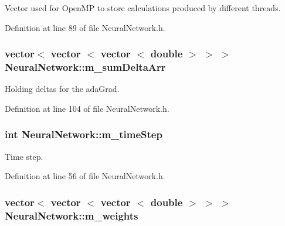 Vector used for Open\+MP to store calculations produced by different threads. 



Definition at line 89 of file Neural\+Network.\+h.

\subsubsection[{\texorpdfstring{m\+\_\+sum\+Delta\+Arr}{m_sumDeltaArr}}]{\setlength{\rightskip}{0pt plus 5cm}vector$<$ vector $<$ vector $<$ double $>$ $>$ $>$ Neural\+Network\+::m\+\_\+sum\+Delta\+Arr\hspace{0.3cm}{\ttfamily [protected]}}\hypertarget{classNeuralNetwork_a0b6c7ff6e00c4f91e684217be91b0a28}{}\label{classNeuralNetwork_a0b6c7ff6e00c4f91e684217be91b0a28}


Holding deltas for the ada\+Grad. 



Definition at line 104 of file Neural\+Network.\+h.

\subsubsection[{\texorpdfstring{m\+\_\+time\+Step}{m_timeStep}}]{\setlength{\rightskip}{0pt plus 5cm}int Neural\+Network\+::m\+\_\+time\+Step\hspace{0.3cm}{\ttfamily [protected]}}\hypertarget{classNeuralNetwork_aea6b9756c3ef7e82b2d40414beb37984}{}\label{classNeuralNetwork_aea6b9756c3ef7e82b2d40414beb37984}


Time step. 



Definition at line 56 of file Neural\+Network.\+h.

\subsubsection[{\texorpdfstring{m\+\_\+weights}{m_weights}}]{\setlength{\rightskip}{0pt plus 5cm}vector$<$ vector $<$ vector $<$ double $>$ $>$ $>$ Neural\+Network\+::m\+\_\+weights\hspace{0.3cm}{\ttfamily [protected]}}\hypertarget{classNeuralNetwork_ad489169464f3a6e827e6fb5de4419061}{}\label{classNeuralNetwork_ad489169464f3a6e827e6fb5de4419061}


